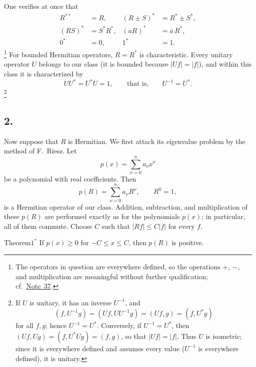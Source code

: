 ﻿\documentclass[paper=b5,fontsize=13pt,bookmarkpackage=false,twoside]{scrartcl}
\newcounter{translatornote}
\begin{document}
One verifies at once that
\begin{align*}
  R^{**}&=R,
  & (R\pm S)^*&=R^*\pm S^*,\\
  (RS)^*&=S^*R^*,
  & (aR)^*&=\overline a\,R^*,\\
  0^*&=0,
  & 1^*&=1.
\end{align*}
\footnote{\label{fn:65}The operators in question are everywhere defined, so the
operations \(+\), \(-\), and multiplication are meaningful without
further qualification; cf.\ \hyperref[fn:37]{Note~37}.}
For bounded Hermitian operators, \(R=R^*\) is characteristic.  Every
unitary operator \(U\) belongs to our class (it is bounded because
\(|Uf|=|f|\)), and within this class it is characterized by
\[
  UU^*=U^*U=1,\qquad\text{that is,}\qquad U^{-1}=U^*.
\]
\footnote{\label{fn:66}If \(U\) is unitary, it has an inverse \(U^{-1}\), and
\[
  (f,U^{-1}g)=(Uf,UU^{-1}g)=(Uf,g)=(f,U^*g)
\]
for all \(f,g\); hence \(U^{-1}=U^*\).  Conversely, if \(U^{-1}=U^*\),
then
\((Uf,Ug)=(f,U^*Ug)=(f,g)\), so that \(|Uf|=|f|\).  Thus \(U\) is
isometric; since it is everywhere defined and assumes every value
(\(U^{-1}\) is everywhere defined), it is unitary.}

\subsection*{2.}
\label{appII:2}

Now suppose that \(R\) is Hermitian.  We first attack its eigenvalue
problem by the method of F.~Riesz.  Let
\[
  p(x)=\sum_{\nu=0}^{n}a_\nu x^\nu
\]
be a polynomial with real coefficients.  Then
\[
  p(R)=\sum_{\nu=0}^{n}a_\nu R^\nu,\qquad R^0=1,
\]
is a Hermitian operator of our class.  Addition, subtraction, and
multiplication of these \(p(R)\) are performed exactly as for the
polynomials \(p(x)\); in particular, all of them commute.  Choose \(C\)
such that \(|Rf|\leq C|f|\) for every \(f\).

\begin{namedstatement}{Theorem}{\(1^*\)}
\label{thm:appII-1}
If \(p(x)\geq0\) for \(-C\leq x\leq C\), then \(p(R)\) is positive.
\end{namedstatement}
\end{document}
